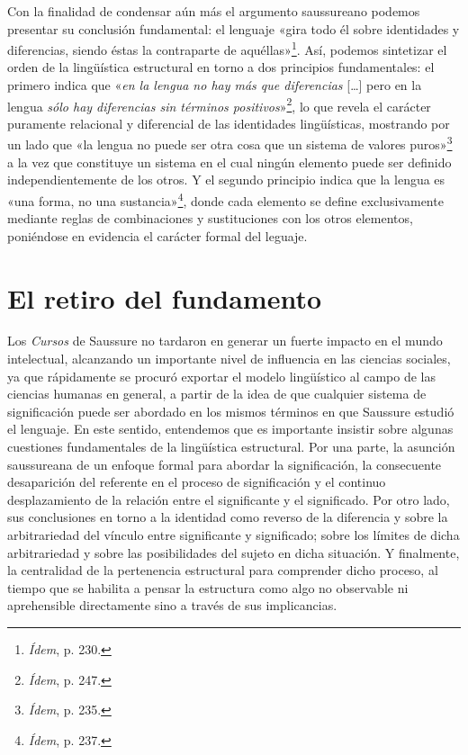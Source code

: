 Con la finalidad de condensar aún más el argumento saussureano podemos presentar su conclusión fundamental: el lenguaje «gira todo él sobre identidades y diferencias, siendo éstas la contraparte de aquéllas»\footnote{\emph{Ídem}, p. 230.}. Así, podemos sintetizar el orden de la lingüística estructural en torno a dos principios fundamentales: el primero indica que «\emph{en la lengua no hay más que diferencias} {[}\ldots{]} pero en la lengua \emph{sólo hay diferencias sin términos positivos}»\footnote{\emph{Ídem}, p. 247.}, lo que revela el carácter puramente relacional y diferencial de las identidades lingüísticas, mostrando por un lado que «la lengua no puede ser otra cosa que un sistema de valores puros»\footnote{\emph{Ídem}, p. 235.} a la vez que constituye un sistema en el cual ningún elemento puede ser definido independientemente de los otros. Y el segundo principio indica que la lengua es «una forma, no una sustancia»\footnote{\emph{Ídem}, p. 237.}, donde cada elemento se define exclusivamente mediante reglas de combinaciones y sustituciones con los otros elementos, poniéndose en evidencia el carácter formal del leguaje.


\section{El retiro del fundamento}

Los \emph{Cursos} de Saussure no tardaron en generar un fuerte impacto en el mundo intelectual, alcanzando un importante nivel de influencia en las ciencias sociales, ya que rápidamente se procuró exportar el modelo lingüístico al campo de las ciencias humanas en general, a partir de la idea de que cualquier sistema de significación puede ser abordado en los mismos términos en que Saussure estudió el lenguaje. En este sentido, entendemos que es importante insistir sobre algunas cuestiones fundamentales de la lingüística estructural. Por una parte, la asunción saussureana de un enfoque formal para abordar la significación, la consecuente desaparición del referente en el proceso de significación y el continuo desplazamiento de la relación entre el significante y el significado. Por otro lado, sus conclusiones en torno a la identidad como reverso de la diferencia y sobre la arbitrariedad del vínculo entre significante y significado; sobre los límites de dicha arbitrariedad y sobre las posibilidades del sujeto en dicha situación. Y finalmente, la centralidad de la pertenencia estructural para comprender dicho proceso, al tiempo que se habilita a pensar la estructura como algo no observable ni aprehensible directamente sino a través de sus implicancias.

